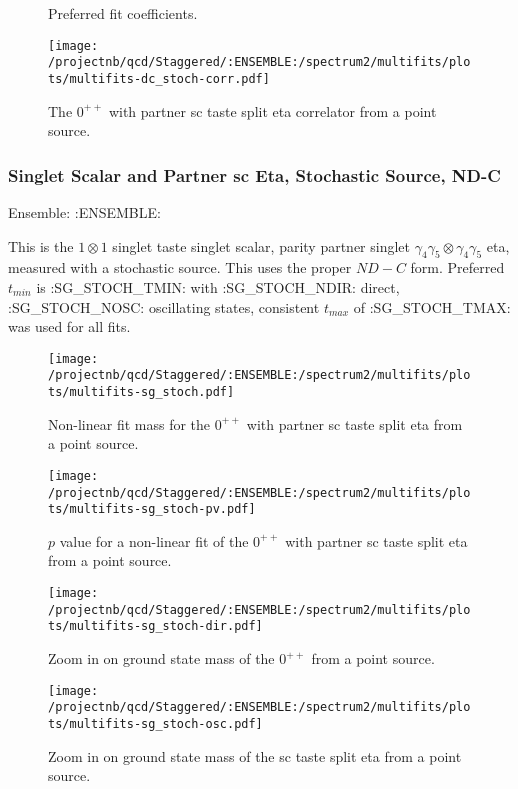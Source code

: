 \begin{multicols}{2}
\begin{figure}[H]
\centering
\scriptsize

\caption{Preferred fit coefficients.}
\end{figure}
\columnbreak
\begin{figure}[H]
\centering
\texttt{[image: /projectnb/qcd/Staggered/:ENSEMBLE:/spectrum2/multifits/plots/multifits-dc\_stoch-corr.pdf]}
\caption{The $0^{++}$ with partner sc taste split eta correlator from a point source.}
\end{figure}
\end{multicols}

\clearpage

\subsubsection{Singlet Scalar and Partner sc Eta, Stochastic Source, ND-C}

Ensemble: :ENSEMBLE:

This is the $1 \otimes 1$ singlet taste singlet scalar, parity partner singlet $\gamma_4 \gamma_5 \otimes \gamma_4 \gamma_5$ eta, measured with a stochastic source. This uses the proper $ND-C$ form. Preferred $t_{min}$ is :SG_STOCH_TMIN: with :SG_STOCH_NDIR: direct, :SG_STOCH_NOSC: oscillating states, consistent $t_{max}$ of :SG_STOCH_TMAX: was used for all fits.

\begin{multicols}{2}
\begin{figure}[H]
\centering
\texttt{[image: /projectnb/qcd/Staggered/:ENSEMBLE:/spectrum2/multifits/plots/multifits-sg\_stoch.pdf]}
\caption{Non-linear fit mass for the $0^{++}$ with partner sc taste split eta from a point source.}
\end{figure}
\columnbreak
\begin{figure}[H]
\centering
\texttt{[image: /projectnb/qcd/Staggered/:ENSEMBLE:/spectrum2/multifits/plots/multifits-sg\_stoch-pv.pdf]}
\caption{$p$ value for a non-linear fit of the $0^{++}$ with partner sc taste split eta from a point source.}
\end{figure}
\end{multicols}

\begin{multicols}{2}
\begin{figure}[H]
\centering
\texttt{[image: /projectnb/qcd/Staggered/:ENSEMBLE:/spectrum2/multifits/plots/multifits-sg\_stoch-dir.pdf]}
\caption{Zoom in on ground state mass of the $0^{++}$ from a point source.}
\end{figure}
\columnbreak
\begin{figure}[H]
\centering
\texttt{[image: /projectnb/qcd/Staggered/:ENSEMBLE:/spectrum2/multifits/plots/multifits-sg\_stoch-osc.pdf]}
\caption{Zoom in on ground state mass of the sc taste split eta from a point source. }
\end{figure}
\end{multicols}

